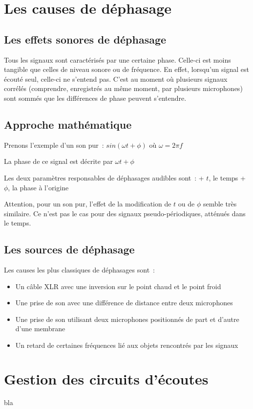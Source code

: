 \documentclass[
]{book}
\providecommand{\tightlist}{%
  \setlength{\itemsep}{0pt}\setlength{\parskip}{0pt}}
\begin{document}
\hypertarget{les-causes-de-duxe9phasage}{%
\chapter{Les causes de déphasage}\label{les-causes-de-duxe9phasage}}

\hypertarget{les-effets-sonores-de-duxe9phasage}{%
\section{Les effets sonores de déphasage}\label{les-effets-sonores-de-duxe9phasage}}

Tous les signaux sont caractérisés par une certaine phase. Celle-ci est moins tangible que celles de niveau sonore ou de fréquence. En effet, lorsqu'un signal est écouté seul, celle-ci ne s'entend pas. C'est au moment où plusieurs signaux corrélés (comprendre, enregistrés au même moment, par plusieurs microphones) sont sommés que les différences de phase peuvent s'entendre.

\hypertarget{approche-mathuxe9matique}{%
\section{Approche mathématique}\label{approche-mathuxe9matique}}

Prenons l'exemple d'un son pur~:
\(sin (\omega t + \phi)\) où \(\omega = 2\pi f\)

La phase de ce signal est décrite par \(\omega t +\phi\)

Les deux paramètres responsables de déphasages audibles sont~:
+ \(t\), le temps
+ \(\phi\), la phase à l'origine

Attention, pour un son pur, l'effet de la modification de \(t\) ou de \(\phi\) semble très similaire. Ce n'est pas le cas pour des signaux pseudo-périodiques, atténués dans le temps.

\hypertarget{les-sources-de-duxe9phasage}{%
\section{Les sources de déphasage}\label{les-sources-de-duxe9phasage}}

Les causes les plus classiques de déphasages sont~:

\begin{itemize}
\tightlist
\item
  Un câble XLR avec une inversion sur le point chaud et le point froid
\item
  Une prise de son avec une différence de distance entre deux microphones
\item
  Une prise de son utilisant deux microphones positionnés de part et d'autre d'une membrane
\item
  Un retard de certaines fréquences lié aux objets rencontrés par les signaux
\end{itemize}

\hypertarget{gestion-des-circuits-duxe9coutes}{%
\chapter{Gestion des circuits d'écoutes}\label{gestion-des-circuits-duxe9coutes}}

bla
\end{document}
